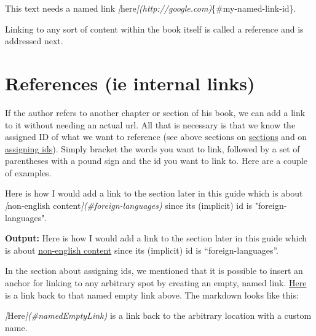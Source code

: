 \documentclass[
]{book}
\newenvironment{Shaded}{\begin{snugshade}}{\end{snugshade}}
\newcommand{\CommentTok}[1]{\textcolor[rgb]{0.56,0.35,0.01}{\textit{#1}}}
\newcommand{\NormalTok}[1]{#1}
\newcommand{\OtherTok}[1]{\textcolor[rgb]{0.56,0.35,0.01}{#1}}
\begin{document}
\begin{Shaded}
\begin{Highlighting}[]
\NormalTok{This text needs a named link }\CommentTok{[}\OtherTok{here}\CommentTok{](http://google.com)}\NormalTok{\{\#my{-}named{-}link{-}id\}.}
\end{Highlighting}
\end{Shaded}

Linking to any sort of content within the book itself is called a reference and is addressed next.

\hypertarget{references}{%
\section{References (ie internal links)}\label{references}}

If the author refers to another chapter or section of his book, we can add a link to it without needing an actual url. All that is necessary is that we know the assigned ID of what we want to reference (see above sections on \protect\hyperlink{chapters-sections-and-more}{sections} and on \protect\hyperlink{assigning-ids}{assigning ids}). Simply bracket the words you want to link, followed by a set of parentheses with a pound sign and the id you want to link to. Here are a couple of examples.

\begin{Shaded}
\begin{Highlighting}[]
\NormalTok{Here is how I would add a link to the section later in this guide which is about }\CommentTok{[}\OtherTok{non{-}english content}\CommentTok{](\#foreign{-}languages)}\NormalTok{ since its (implicit) id is "foreign{-}languages".}
\end{Highlighting}
\end{Shaded}

\textbf{Output:}
Here is how I would add a link to the section later in this guide which is about \protect\hyperlink{foreign-languages}{non-english content} since its (implicit) id is ``foreign-languages''.

In the section about assigning ids, we mentioned that it is possible to insert an anchor for linking to any arbitrary spot by creating an empty, named link. \protect\hyperlink{namedEmptyLink}{Here} is a link back to that named empty link above. The markdown looks like this:

\begin{Shaded}
\begin{Highlighting}[]
\CommentTok{[}\OtherTok{Here}\CommentTok{](\#namedEmptyLink)}\NormalTok{ is a link back to the arbitrary location with a custom name. }
\end{Highlighting}
\end{Shaded}
\end{document}
